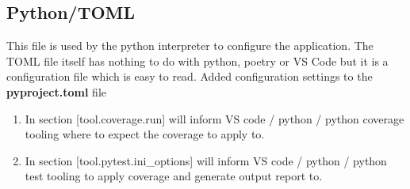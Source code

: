 \subsection{Python/TOML}
This file is used by the python interpreter to configure the application. The TOML file itself has nothing to do with python, poetry or VS Code but it is a configuration file which is easy to read.
Added configuration settings to the \textbf{pyproject.toml} file
\begin{enumerate}
	\item In section [tool.coverage.run]  will inform VS code / python / python coverage tooling where to expect the coverage to apply to.
	\item In section [tool.pytest.ini\_options]  will inform VS code / python / python test tooling to apply coverage and generate output report to.
\end{enumerate}


